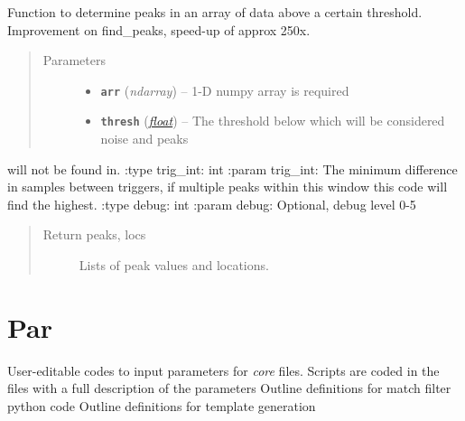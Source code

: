\documentclass[a4paper,10pt,english]{sphinxmanual}
\begin{document}

\begin{fulllineitems}
\label{modules:findpeaks.find_peaks2}
Function to determine peaks in an array of data above a certain threshold.
Improvement on find\_peaks, speed-up of approx 250x.
\begin{quote}\begin{description}
\item[{Parameters}] \leavevmode\begin{itemize}
\item {} 
\textbf{\texttt{arr}} (\emph{ndarray}) -- 1-D numpy array is required

\item {} 
\textbf{\texttt{thresh}} (\href{https://docs.python.org/library/functions.html\#float}{\emph{float}}) -- The threshold below which will be considered noise and peaks

\end{itemize}

\end{description}\end{quote}

will not be found in.
:type trig\_int: int
:param trig\_int: The minimum difference in samples between triggers,
if multiple peaks within this window this code will find the highest.
:type debug: int
:param debug: Optional, debug level 0-5
\begin{quote}\begin{description}
\item[{Return peaks, locs}] \leavevmode
Lists of peak values and locations.

\end{description}\end{quote}

\end{fulllineitems}



\chapter{Par}
\label{modules:par}
User-editable codes to input parameters for \emph{core} files.
Scripts are coded in the files with a full description of the parameters
\label{modules:module-match_filter_par}
Outline definitions for match filter python code
\label{modules:module-template_gen_par}
Outline definitions for template generation
\end{document}
